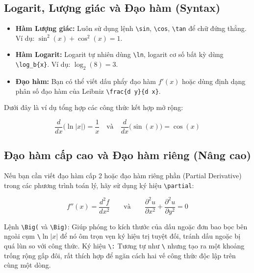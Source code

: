 \documentclass{article}
\begin{document}
\subsection{Logarit, Lượng giác và Đạo hàm (Syntax)}

\begin{itemize}
    \item \textbf{Hàm Lượng giác:} Luôn sử dụng lệnh \texttt{\textbackslash sin}, \texttt{\textbackslash cos}, \texttt{\textbackslash tan} để chữ đứng thẳng. Ví dụ: $\sin^2(x) + \cos^2(x) = 1$.
    \item \textbf{Hàm Logarit:} Logarit tự nhiên dùng \texttt{\textbackslash ln}, logarit cơ số bất kỳ dùng \texttt{\textbackslash log\_b\{x\}}. Ví dụ: $\log_2(8) = 3$.
    \item \textbf{Đạo hàm:} Bạn có thể viết dấu phẩy đạo hàm $f'(x)$ hoặc dùng định dạng phân số đạo hàm của Leibniz \texttt{\textbackslash frac\{d y\}\{d x\}}.
\end{itemize}

\noindent Dưới đây là ví dụ tổng hợp các công thức kết hợp mở rộng:

\begin{equation}
    \frac{d}{dx}\Big( \ln|x| \Big) = \frac{1}{x} \quad \text{và} \quad \frac{d}{dx}\Big( \sin(x) \Big) = \cos(x)
\end{equation}

\subsection{Đạo hàm cấp cao và Đạo hàm riêng (Nâng cao)}
Nếu bạn cần viết đạo hàm cấp 2 hoặc đạo hàm riêng phần (Partial Derivative) trong các phương trình toán lý, hãy sử dụng ký hiệu \texttt{\textbackslash partial}:

\begin{equation}
    f''(x) = \frac{d^2 f}{dx^2} \qquad \text{và} \qquad \frac{\partial^2 u}{\partial x^2} + \frac{\partial^2 u}{\partial y^2} = 0
\end{equation}

Lệnh \texttt{\textbackslash Big(} và \texttt{\textbackslash Big)}: 
Giúp phóng to kích thước của dấu ngoặc đơn bao bọc bên ngoài cụm 
\texttt{\textbackslash \(\ln\vert{}x\vert{}\)} để nó ôm trọn vẹn ký hiệu trị tuyệt đối, 
tránh dấu ngoặc bị quá lùn so với công thức.
Ký hiệu \texttt{\textbackslash \qquad:} Tương tự như \texttt{\textbackslash \quad} nhưng tạo ra một khoảng trống rộng gấp đôi, 
rất thích hợp để ngăn cách hai vế công thức độc lập trên cùng một dòng.
\end{document}
